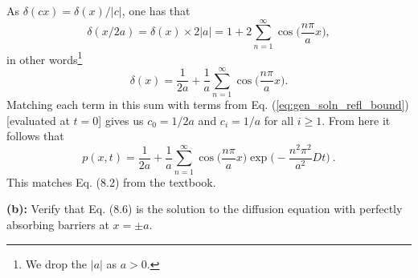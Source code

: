 As $\delta(c x) = \delta(x) / |c|$, one has that
\begin{equation}
\delta(x/2a) = \delta(x) \times 2 |a| = 1 + 2 \sum_{n=1}^{\infty} \cos\bigg(\frac{n \pi}{a} x \bigg), \nonumber
\end{equation}
in other words\footnote{We drop the $|a|$ as $a>0$.}
\begin{equation}
\delta(x) = \frac{1}{2a} + \frac{1}{a} \sum_{n=1}^{\infty} \cos\bigg(\frac{n \pi}{a} x \bigg).
\end{equation}
Matching each term in this sum with terms from Eq. (\ref{eq:gen_soln_refl_bound}) [evaluated at $t=0$] gives us $c_0 = 1/2a$ and $c_i = 1/a$ for all $i\geq 1$. From here it follows that
\begin{equation}
\boxed{p(x,t) = \frac{1}{2 a} +  \frac{1}{a}\sum_{n=1}^{\infty} \cos\bigg(\frac{n \pi}{a} x \bigg) \exp\bigg(-\frac{n^2 \pi^2}{a^2} D t \bigg)}~.
\end{equation}
This matches Eq. (8.2) from the textbook.

\textbf{(b):} Verify that Eq. (8.6) is the solution to the diffusion equation with perfectly absorbing barriers at $x=\pm a$.

